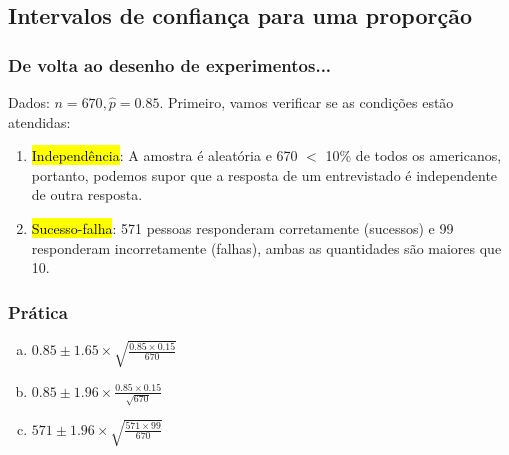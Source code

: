 
\subsection{Intervalos de confiança para uma proporção}


\begin{frame}
\frametitle{De volta ao desenho de experimentos...}
\justifying
{}

\pause
\justifying
Dados: $n = 670, \hat{p} = 0.85$. 
\small
Primeiro, vamos verificar se as condições estão atendidas:

\pause
\begin{enumerate}[1.]
\justifying
\item \hl{Independência}: A amostra é aleatória e 670 $<$ 10\% de todos os americanos, portanto, podemos supor que a resposta de um entrevistado é independente de outra resposta.
\pause
\justifying
\item \hl{Sucesso-falha}: 571 pessoas responderam corretamente (sucessos) e 99 responderam incorretamente (falhas), ambas as quantidades são maiores que 10.
\end{enumerate}

\end{frame}


\begin{frame}
\frametitle{Prática}
\justifying
{}

\begin{enumerate}[(a)]
\justifying
{}
\justifying
{}
\item $0.85 \pm 1.65 \times \sqrt{\frac{0.85 \times 0.15}{670}}$
\item $0.85 \pm 1.96 \times \frac{0.85 \times 0.15}{\sqrt{670}}$
\item $571 \pm 1.96 \times \sqrt{\frac{571 \times 99}{670}}$
\end{enumerate}

\end{frame}

